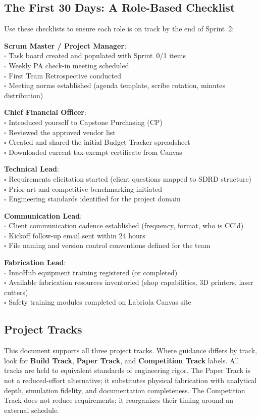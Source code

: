 \subsection*{The First 30 Days: A Role-Based Checklist}
Use these checklists to ensure each role is on track by the end of Sprint~2:

\textbf{Scrum Master / Project Manager}: \\
$\square$ Task board created and populated with Sprint~0/1 items \\
$\square$ Weekly PA check-in meeting scheduled \\
$\square$ First Team Retrospective conducted \\
$\square$ Meeting norms established (agenda template, scribe rotation, minutes distribution)

\textbf{Chief Financial Officer}: \\
$\square$ Introduced yourself to Capstone Purchasing (CP) \\
$\square$ Reviewed the approved vendor list \\
$\square$ Created and shared the initial Budget Tracker spreadsheet \\
$\square$ Downloaded current tax-exempt certificate from Canvas

\textbf{Technical Lead}: \\
$\square$ Requirements elicitation started (client questions mapped to SDRD structure) \\
$\square$ Prior art and competitive benchmarking initiated \\
$\square$ Engineering standards identified for the project domain

\textbf{Communication Lead}: \\
$\square$ Client communication cadence established (frequency, format, who is CC'd) \\
$\square$ Kickoff follow-up email sent within 24 hours \\
$\square$ File naming and version control conventions defined for the team

\textbf{Fabrication Lead}: \\
$\square$ InnoHub equipment training registered (or completed) \\
$\square$ Available fabrication resources inventoried (shop capabilities, 3D printers, laser cutters) \\
$\square$ Safety training modules completed on Labriola Canvas site

\subsection*{Project Tracks}
This document supports all three project tracks. Where guidance differs by track, look for \textbf{Build Track}, \textbf{Paper Track}, and \textbf{Competition Track} labels. All tracks are held to equivalent standards of engineering rigor. The Paper Track is not a reduced-effort alternative; it substitutes physical fabrication with analytical depth, simulation fidelity, and documentation completeness. The Competition Track does not reduce requirements; it reorganizes their timing around an external schedule.



